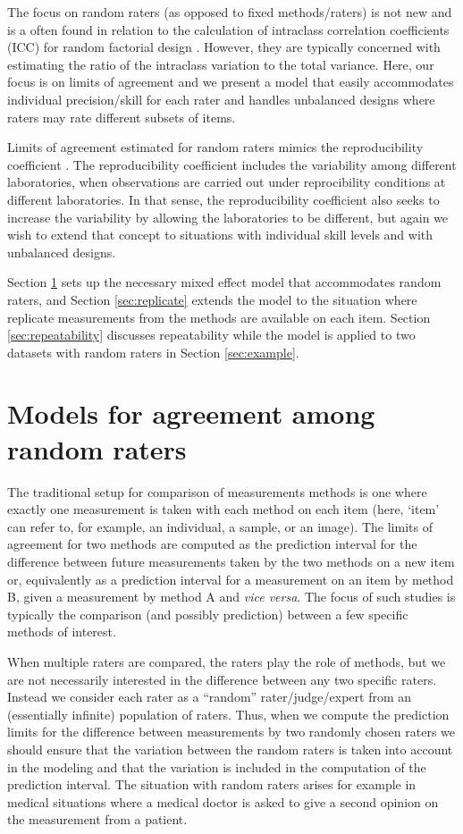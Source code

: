 \documentclass[aoas]{imsart}
\begin{document}
The focus on random raters (as opposed to fixed methods/raters) is not
new and is a often found in relation to the calculation of intraclass
correlation coefficients (ICC) for random factorial design
\citep{Shoukri2010,Kilem2012}. However, they are typically concerned
with estimating the ratio of the intraclass variation to the total
variance. Here, our focus is on limits of agreement and we present a
model that easily accommodates individual precision/skill for each
rater and handles unbalanced designs where raters may rate different
subsets of items.

Limits of agreement estimated for random raters mimics the
reproducibility coefficient  \citep{ISO1994}. The reproducibility
coefficient includes the variability among different laboratories,
when observations are carried out under reprocibility conditions at
different laboratories. In that sense, the reproducibility coefficient
also seeks to increase the variability by allowing the laboratories to
be different, but again we wish to extend that concept to situations with
individual skill levels and with unbalanced designs. 

Section \ref{sec:model} sets up the necessary mixed effect model that
accommodates random raters, and Section \ref{sec:replicate} extends
the model to the situation where replicate measurements from the
methods are available on each item. Section \ref{sec:repeatability}
discusses repeatability while the model is applied to two datasets
with random raters in Section \ref{sec:example}.

\section{Models for agreement among random raters}
\label{sec:model}

The traditional setup for comparison of measurements methods is one
where exactly one measurement is taken with each method on each item
(here, `item' can refer to, for example, an individual, a sample, or
an image). The limits of agreement for two methods are computed as the
prediction interval for the difference between future measurements
taken by the two methods on a new item or, equivalently as a
prediction interval for a measurement on an item by method B, given a
measurement by method A and \emph{vice versa}. The focus of such
studies is typically the comparison (and possibly prediction) between
a few specific methods of interest.

When multiple raters are compared, the raters play the role of
methods, but we are not necessarily interested in the difference between any two
specific raters. Instead we consider each rater as a ``random'' rater/judge/expert
from an (essentially infinite) population of raters. Thus, when we
compute the prediction limits for the difference between measurements
by two randomly chosen raters we should ensure that the variation
between the random raters is taken into account in the modeling and
that the variation is included in the computation of the prediction
interval. The situation with random raters arises for example in
medical situations where a medical doctor is asked to give a second
opinion on the measurement from a patient.
\end{document}
